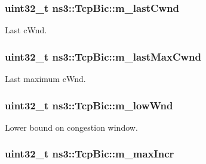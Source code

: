 \subsubsection[{\texorpdfstring{m\+\_\+last\+Cwnd}{m_lastCwnd}}]{\setlength{\rightskip}{0pt plus 5cm}uint32\+\_\+t ns3\+::\+Tcp\+Bic\+::m\+\_\+last\+Cwnd\hspace{0.3cm}{\ttfamily [private]}}\hypertarget{classns3_1_1TcpBic_a5014112a75f21b8bc1a0e50b79ab4e31}{}\label{classns3_1_1TcpBic_a5014112a75f21b8bc1a0e50b79ab4e31}


Last c\+Wnd. 

\subsubsection[{\texorpdfstring{m\+\_\+last\+Max\+Cwnd}{m_lastMaxCwnd}}]{\setlength{\rightskip}{0pt plus 5cm}uint32\+\_\+t ns3\+::\+Tcp\+Bic\+::m\+\_\+last\+Max\+Cwnd\hspace{0.3cm}{\ttfamily [private]}}\hypertarget{classns3_1_1TcpBic_a082025c05e83dcddab77a6e3209cd4eb}{}\label{classns3_1_1TcpBic_a082025c05e83dcddab77a6e3209cd4eb}


Last maximum c\+Wnd. 

\subsubsection[{\texorpdfstring{m\+\_\+low\+Wnd}{m_lowWnd}}]{\setlength{\rightskip}{0pt plus 5cm}uint32\+\_\+t ns3\+::\+Tcp\+Bic\+::m\+\_\+low\+Wnd\hspace{0.3cm}{\ttfamily [private]}}\hypertarget{classns3_1_1TcpBic_a1a7a6a7c186075fba672ff3328eb85ec}{}\label{classns3_1_1TcpBic_a1a7a6a7c186075fba672ff3328eb85ec}


Lower bound on congestion window. 

\subsubsection[{\texorpdfstring{m\+\_\+max\+Incr}{m_maxIncr}}]{\setlength{\rightskip}{0pt plus 5cm}uint32\+\_\+t ns3\+::\+Tcp\+Bic\+::m\+\_\+max\+Incr\hspace{0.3cm}{\ttfamily [private]}}\hypertarget{classns3_1_1TcpBic_a79db4e8443cc0a27388a80566327a5a0}{}\label{classns3_1_1TcpBic_a79db4e8443cc0a27388a80566327a5a0}


